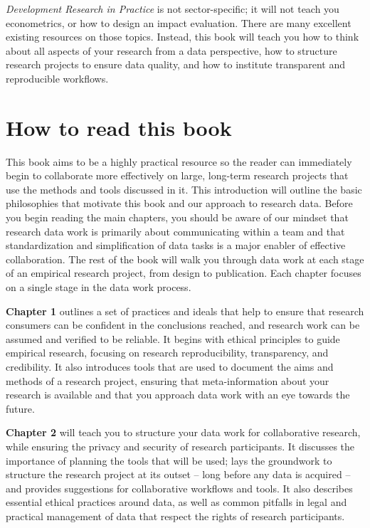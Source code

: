 \textit{Development Research in Practice} is not sector-specific;
it will not teach you econometrics,
or how to design an impact evaluation.
There are many excellent existing resources on those topics.
Instead, this book will teach you how to think about all aspects of your research from a data perspective,
how to structure research projects to ensure data quality,
and how to institute transparent and reproducible workflows.




\section{How to read this book}

This book aims to be a highly practical resource so the reader can
immediately begin to collaborate more effectively
on large, long-term research projects
that use the methods and tools discussed in it.
This introduction will outline the basic philosophies
that motivate this book and our approach to research data.
Before you begin reading the main chapters,
you should be aware of our mindset
that research data work is primarily about
communicating within a team
and that standardization and simplification of data tasks
is a major enabler of effective collaboration.
The rest of the book will walk you through data work at each stage
of an empirical research project, from design to publication.
Each chapter focuses on a single stage in the data work process.

\textbf{Chapter 1} outlines a set of practices and ideals that help to ensure that
research consumers can be confident in the conclusions reached,
and research work can be assumed and verified to be reliable.
It begins with ethical principles to guide empirical research,
focusing on research reproducibility, transparency, and credibility.
It also introduces tools that are used to document
the aims and methods of a research project,
ensuring that meta-information about your research is available
and that you approach data work with an eye towards the future.

\textbf{Chapter 2} will teach you to structure your data work for collaborative research,
while ensuring the privacy and security of research participants.
It discusses the importance of planning the tools that will be used;
lays the groundwork to structure the research project at its outset --
long before any data is acquired --
and provides suggestions for collaborative workflows and tools.
It also describes essential ethical practices around data,
as well as common pitfalls in legal and practical management of data
that respect the rights of research participants.

